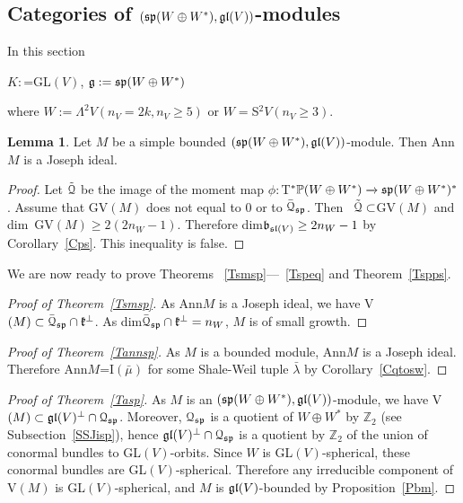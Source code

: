 \documentclass[12pt]{amsart}
\theoremstyle{definition}\newtheorem{theorem}{Theorem}[section]
\newtheorem{lemma}[proposition]{Lemma}
\theoremstyle{definition}\newtheorem{definition}[proposition]{Definition}
\theoremstyle{remark}\newtheorem{example}[proposition]{Example}
\renewcommand{\to}[1][]{\xrightarrow{#1}}
\begin{document}
\subsection{Categories of $(\frak{sp}(W\oplus W^*), \frak{gl}(V))$-modules}\label{Sspgl}In this section \begin{center}$K:$=GL$(V)$, $\frak g:=\frak{sp}(W\oplus W^*)$\end{center} where $W:=\Lambda^2V (n_V=2k, n_V\ge5)$ or $W=$S$^2V (n_V\ge3)$.
\begin{lemma}\label{LspJ}Let $M$ be a simple bounded $(\frak{sp}(W\oplus W^*), \frak{gl}(V))$-module. Then Ann$M$ is a Joseph ideal.\end{lemma}
\begin{proof}Let $\tilde{\EuScript Q}$ be the image of the moment map $\phi:$T$^*\mathbb P(W\oplus W^*)\to\frak{sp}(W\oplus W^*)^*$. Assume that GV$(M)$ does not equal to 0 or to $\bar{\EuScript Q}_\frak{sp}$. Then~\cite[6.2]{CM} $\tilde{\EuScript Q}\subset$GV$(M)$ and dim~GV$(M)\ge2(2n_W-1)$. Therefore dim$\frak b_{\frak{sl}(V)}\ge2n_W-1$ by Corollary~\ref{Cps}. This inequality is false.\end{proof}
We are now ready to prove Theorems ~\ref{Tsmsp}---~\ref{Tspeq} and Theorem~\ref{Tspps}.%
\begin{proof}[Proof of Theorem~\ref{Tsmsp}] As Ann$M$ is a Joseph ideal, we have V$(M)\subset\bar{\EuScript Q}_{\frak{sp}}\cap\frak k^\bot$. As dim$\bar{\EuScript Q}_{\frak{sp}}\cap\frak k^\bot=n_W$, $M$ is of small growth.\end{proof}
\begin{proof}[Proof of Theorem~\ref{Tannsp}]As $M$ is a bounded module, Ann$M$ is a Joseph ideal. Therefore Ann$M$=I$(\bar\mu)$ for some Shale-Weil tuple $\bar\lambda$ by Corollary~\ref{Cqtosw}.\end{proof}
\begin{proof}[Proof of Theorem~\ref{Tasp}]As $M$ is an $(\frak{sp}(W\oplus W^*), \frak{gl}(V))$-module, we have V$(M)\subset\frak{gl}(V)^\bot\cap\EuScript Q_\frak{sp}$. Moreover, $\EuScript Q_\frak{sp}$ is a quotient of $W\oplus W^*$ by $\mathbb Z_2$ (see Subsection~\ref{SSJisp}), hence $\frak{gl}(V)^\bot\cap\EuScript Q_\frak{sp}$ is a quotient by $\mathbb Z_2$ of the union of conormal bundles to GL$(V)$-orbits. Since $W$ is GL$(V)$-spherical, these conormal bundles are GL$(V)$-spherical. Therefore any irreducible component of V$(M)$ is GL$(V)$-spherical, and $M$ is $\frak{gl}(V)$-bounded by Proposition~\ref{Pbm}.\end{proof}
\end{document}
